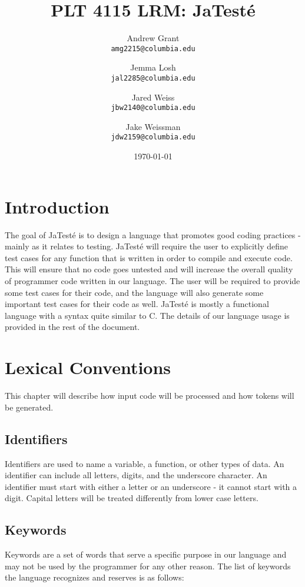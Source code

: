\documentclass{article}
\title{PLT 4115 LRM: \textbf{JaTest\'{e}}}
\author{
	Andrew Grant\\
	\texttt{amg2215@columbia.edu}
	\and
	Jemma Losh\\
	\texttt{jal2285@columbia.edu}
	\and
	Jared Weiss\\
	\texttt{jbw2140@columbia.edu}
	\and
	Jake Weissman\\
	\texttt{jdw2159@columbia.edu}
}
\date{\today}
\begin{document}
\maketitle
\newpage

\tableofcontents
\newpage

\section{Introduction}
The goal of JaTest\'{e} is to design a language that promotes good coding practices - mainly as it relates to testing.  JaTest\'{e} will require the user to explicitly define test cases for any function that is written in order to compile and execute code.  This will ensure that no code goes untested and will increase the overall quality of programmer code written in our language.  The user will be required to provide some test cases for their code, and the language will also generate some important test cases for their code as well.  JaTest\'{e} is mostly a functional language with a syntax quite similar to C.  The details of our language usage is provided in the rest of the document.

\section{Lexical Conventions}
This chapter will describe how input code will be processed and how tokens will be generated.

\subsection{Identifiers}
Identifiers are used to name a variable, a function, or other types of data.  An identifier can include all letters, digits, and the underscore character.  An identifier must start with either a letter or an underscore - it cannot start with a digit.  Capital letters will be treated differently from lower case letters.

\subsection{Keywords}
Keywords are a set of words that serve a specific purpose in our language and may not be used by the programmer for any other reason.  The list of keywords the language recognizes and reserves is as follows: 
\end{document}

